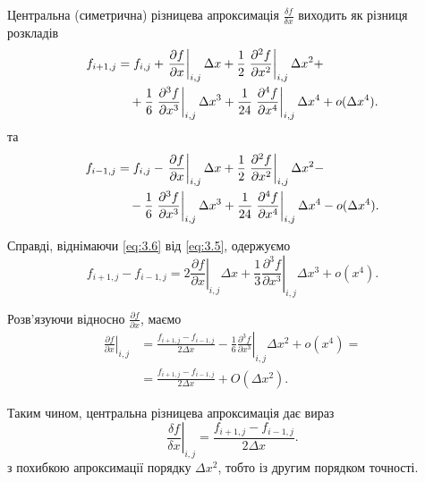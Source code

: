 Центральна (симетрична) різницева апроксимація $\frac{\delta f}{\delta x}$ виходить як різниця розкладів
\begin{equation}
    \label{eq:3.5}
    \begin{aligned}
        f_{i + 1, j} &= f_{i, j} + \left. \frac{\partial f}{\partial x} \right|_{i, j} \Delta x + \frac{1}{2} \left. \frac{\partial^2 f}{\partial x^2} \right|_{i, j} \Delta x^2 + \\ 
        &\quad + \frac{1}{6} \left. \frac{\partial^3 f}{\partial x^3} \right|_{i, j} \Delta x^3 + \frac{1}{24} \left. \frac{\partial^4 f}{\partial x^4} \right|_{i, j} \Delta x^4 + o(\Delta x^4).
    \end{aligned}
\end{equation}
та
\begin{equation}
    \label{eq:3.6}
    \begin{aligned}
        f_{i - 1, j} &= f_{i, j} - \left. \frac{\partial f}{\partial x} \right|_{i, j} \Delta x + \frac{1}{2} \left. \frac{\partial^2 f}{\partial x^2} \right|_{i, j} \Delta x^2 - \\ 
        &\quad - \frac{1}{6} \left. \frac{\partial^3 f}{\partial x^3} \right|_{i, j} \Delta x^3 + \frac{1}{24} \left. \frac{\partial^4 f}{\partial x^4} \right|_{i, j} \Delta x^4 - o(\Delta x^4).
    \end{aligned}
\end{equation}

Справді, віднімаючи \eqref{eq:3.6} від \eqref{eq:3.5}, одержуємо
\begin{equation*}
    f_{i + 1, j} - f_{i - 1, j} = 2 \left. \frac{\partial f}{\partial x} \right|_{i, j} \Delta x + \frac{1}{3} \left. \frac{\partial^3 f}{\partial x^3} \right|_{i, j} \Delta x^3 + o(x^4).
\end{equation*}

Розв'язуючи відносно $\frac{\partial f}{\partial x}$, маємо
\begin{equation}
    \label{eq:3.7}
    \begin{aligned}
        \left. \frac{\partial f}{\partial x} \right|_{i, j} &= \frac{f_{i + 1, j} - f_{i - 1, j}}{2\Delta x} - \frac{1}{6} \left. \frac{\partial^3 f}{\partial x^3} \right|_{i, j} \Delta x^2 + o(x^4) = \\
        &= \frac{f_{i + 1, j} - f_{i - 1, j}}{2\Delta x} + O(\Delta x^2).
    \end{aligned}
\end{equation}

\begin{th_formula}
    Таким чином, центральна різницева апроксимація дає вираз
    \begin{equation}
        \label{eq:3.8}
        \left. \frac{\delta f}{\delta x} \right|_{i, j} = \frac{f_{i + 1, j} - f_{i - 1, j}}{2\Delta x}.
    \end{equation}
    з похибкою апроксимації порядку $\Delta x^2$, тобто із другим порядком точності.
\end{th_formula}

